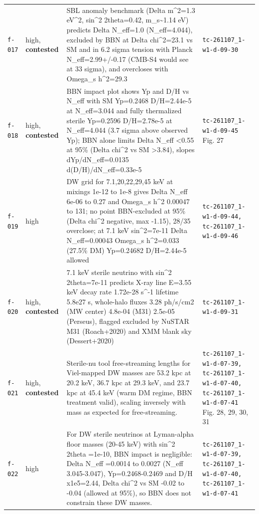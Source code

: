 \documentclass[11pt,a4paper]{article}
\begin{document}
\begin{longtable}{@{}p{}p{}p{}p{}@{}}
\texttt{f-017} & high, \textbf{contested} & SBL anomaly benchmark (Delta m\textasciicircum{}2=1.3 eV\textasciicircum{}2, sin\textasciicircum{}2 2theta=0.42, m\_s\textasciitilde{}1.14 eV) predicts Delta N\_eff=1.0 (N\_eff=4.044), excluded by BBN at Delta chi\textasciicircum{}2=23.1 vs SM and in 6.2 sigma tension with Planck N\_eff=2.99+/-0.17 (CMB-S4 would see at 33 sigma), and overcloses with Omega\_s h\textasciicircum{}2=29.3 & \texttt{tc-261107\_\allowbreak{}1-w1-d-09-30} \\
\texttt{f-018} & high, \textbf{contested} & BBN impact plot shows Yp and D/H vs N\_eff with SM Yp=0.2468 D/H=2.44e-5 at N\_eff=3.044 and fully thermalized sterile Yp=0.2596 D/H=2.78e-5 at N\_eff=4.044 (3.7 sigma above observed Yp); BBN alone limits Delta N\_eff \textless{}0.55 at 95\% (Delta chi\textasciicircum{}2 vs SM \textgreater{}3.84), slopes dYp/dN\_eff=0.0135 d(D/H)/dN\_eff=0.33e-5 & \texttt{tc-261107\_\allowbreak{}1-w1-d-09-45} Fig. 27 \\
\texttt{f-019} & high & DW grid for 7.1,20,22,29,45 keV at mixings 1e-12 to 1e-8 gives Delta N\_eff 6e-06 to 0.27 and Omega\_s h\textasciicircum{}2 0.00047 to 131; no point BBN-excluded at 95\% (Delta chi\textasciicircum{}2 negative, max -1.15), 28/35 overclose; at 7.1 keV sin\textasciicircum{}2=7e-11 Delta N\_eff=0.00043 Omega\_s h\textasciicircum{}2=0.033 (27.5\% DM) Yp=0.24682 D/H=2.44e-5 allowed & \texttt{tc-261107\_\allowbreak{}1-w1-d-09-44,\allowbreak{} tc-261107\_\allowbreak{}1-w1-d-09-46} \\
\texttt{f-020} & high, \textbf{contested} & 7.1 keV sterile neutrino with sin\textasciicircum{}2 2theta=7e-11 predicts X-ray line E=3.55 keV decay rate 1.72e-28 s\textasciicircum{}-1 lifetime 5.8e27 s, whole-halo fluxes 3.28 ph/s/cm2 (MW center) 4.8e-04 (M31) 2.5e-05 (Perseus), flagged excluded by NuSTAR M31 (Roach+2020) and XMM blank sky (Dessert+2020) & \texttt{tc-261107\_\allowbreak{}1-w1-d-09-31} \\
\texttt{f-021} & high, \textbf{contested} & Sterile-nu tool free-streaming lengths for Viel-mapped DW masses are 53.2 kpc at 20.2 keV, 36.7 kpc at 29.3 keV, and 23.7 kpc at 45.4 keV (warm DM regime, BBN treatment valid), scaling inversely with mass as expected for free-streaming. & \texttt{tc-261107\_\allowbreak{}1-w1-d-07-39,\allowbreak{} tc-261107\_\allowbreak{}1-w1-d-07-40,\allowbreak{} tc-261107\_\allowbreak{}1-w1-d-07-41} Fig. 28, 29, 30, 31 \\
\texttt{f-022} & high & For DW sterile neutrinos at Lyman-alpha floor masses (20-45 keV) with sin\textasciicircum{}2 2theta =1e-10, BBN impact is negligible: Delta N\_eff =0.0014 to 0.0027 (N\_eff 3.045-3.047), Yp=0.2468-0.2469 and D/H x1e5=2.44, Delta chi\textasciicircum{}2 vs SM -0.02 to -0.04 (allowed at 95\%), so BBN does not constrain these DW masses. & \texttt{tc-261107\_\allowbreak{}1-w1-d-07-39,\allowbreak{} tc-261107\_\allowbreak{}1-w1-d-07-40,\allowbreak{} tc-261107\_\allowbreak{}1-w1-d-07-41} \\

\end{longtable}
\end{document}
